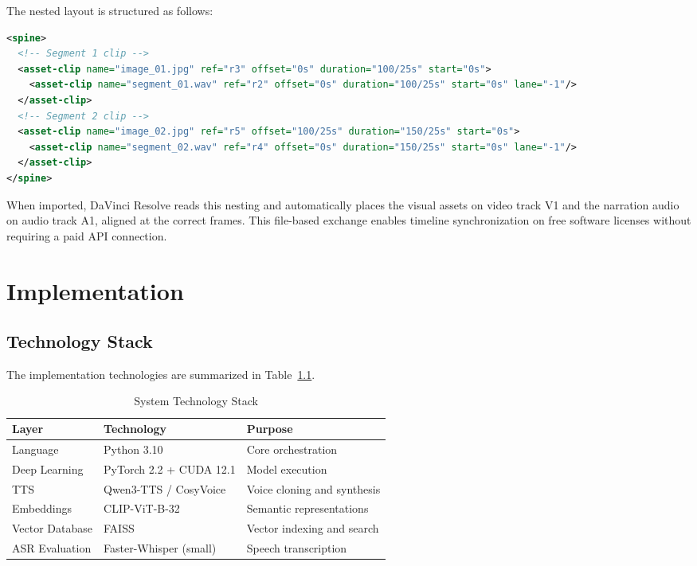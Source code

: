 \documentclass[a4paper,12pt]{report}
\begin{document}
The nested layout is structured as follows:
\begin{singlespace}
\begin{lstlisting}[language=XML]
<spine>
  <!-- Segment 1 clip -->
  <asset-clip name="image_01.jpg" ref="r3" offset="0s" duration="100/25s" start="0s">
    <asset-clip name="segment_01.wav" ref="r2" offset="0s" duration="100/25s" start="0s" lane="-1"/>
  </asset-clip>
  <!-- Segment 2 clip -->
  <asset-clip name="image_02.jpg" ref="r5" offset="100/25s" duration="150/25s" start="0s">
    <asset-clip name="segment_02.wav" ref="r4" offset="0s" duration="150/25s" start="0s" lane="-1"/>
  </asset-clip>
</spine>
\end{lstlisting}
\end{singlespace}

When imported, DaVinci Resolve reads this nesting and automatically places the visual assets on video track V1 and the narration audio on audio track A1, aligned at the correct frames. This file-based exchange enables timeline synchronization on free software licenses without requiring a paid API connection.

\newpage


\chapter{Implementation}
\label{ch:implementation}

\section{Technology Stack}
The implementation technologies are summarized in Table~\ref{tab:tech_stack}.

\begin{table}[h!]
\centering
\small
\begin{tabular}{p{3.5cm}p{6cm}p{5cm}}
\toprule
\textbf{Layer} & \textbf{Technology} & \textbf{Purpose} \\
\midrule
Language & Python 3.10 & Core orchestration \\
Deep Learning & PyTorch 2.2 + CUDA 12.1 & Model execution \\
TTS & Qwen3-TTS / CosyVoice & Voice cloning and synthesis \\
Embeddings & CLIP-ViT-B-32 & Semantic representations \\
Vector Database & FAISS & Vector indexing and search \\
ASR Evaluation & Faster-Whisper (small) & Speech transcription \\
\bottomrule
\end{tabular}
\caption{System Technology Stack}
\label{tab:tech_stack}
\end{table}
\end{document}
